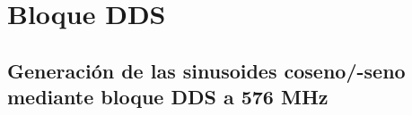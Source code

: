 \chapter{Bloque DDS}
\label{section:dds}



\section*{Generación de las sinusoides coseno/-seno mediante bloque DDS a 576 MHz }




